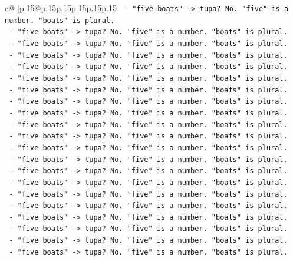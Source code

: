 \documentclass{article}
\begin{document}
{\begin{supertabular}{c@{$\;$}|p{.15\linewidth}@{}p{.15\linewidth}p{.15\linewidth}p{.15\linewidth}p{.15\linewidth}p{.15\linewidth}}
{{{\texttt{   {-} "five boats" {-}> tupa? No. "five" is a number. "boats" is plural.} \\
\texttt{   {-} "five boats" {-}> tupa? No. "five" is a number. "boats" is plural.} \\
\texttt{   {-} "five boats" {-}> tupa? No. "five" is a number. "boats" is plural.} \\
\texttt{   {-} "five boats" {-}> tupa? No. "five" is a number. "boats" is plural.} \\
\texttt{   {-} "five boats" {-}> tupa? No. "five" is a number. "boats" is plural.} \\
\texttt{   {-} "five boats" {-}> tupa? No. "five" is a number. "boats" is plural.} \\
\texttt{   {-} "five boats" {-}> tupa? No. "five" is a number. "boats" is plural.} \\
\texttt{   {-} "five boats" {-}> tupa? No. "five" is a number. "boats" is plural.} \\
\texttt{   {-} "five boats" {-}> tupa? No. "five" is a number. "boats" is plural.} \\
\texttt{   {-} "five boats" {-}> tupa? No. "five" is a number. "boats" is plural.} \\
\texttt{   {-} "five boats" {-}> tupa? No. "five" is a number. "boats" is plural.} \\
\texttt{   {-} "five boats" {-}> tupa? No. "five" is a number. "boats" is plural.} \\
\texttt{   {-} "five boats" {-}> tupa? No. "five" is a number. "boats" is plural.} \\
\texttt{   {-} "five boats" {-}> tupa? No. "five" is a number. "boats" is plural.} \\
\texttt{   {-} "five boats" {-}> tupa? No. "five" is a number. "boats" is plural.} \\
\texttt{   {-} "five boats" {-}> tupa? No. "five" is a number. "boats" is plural.} \\
\texttt{   {-} "five boats" {-}> tupa? No. "five" is a number. "boats" is plural.} \\
\texttt{   {-} "five boats" {-}> tupa? No. "five" is a number. "boats" is plural.} \\
\texttt{   {-} "five boats" {-}> tupa? No. "five" is a number. "boats" is plural.} \\
\texttt{   {-} "five boats" {-}> tupa? No. "five" is a number. "boats" is plural.} \\
\texttt{   {-} "five boats" {-}> tupa? No. "five" is a number. "boats" is plural.} \\
}}}
\end{supertabular}}
\end{document}
